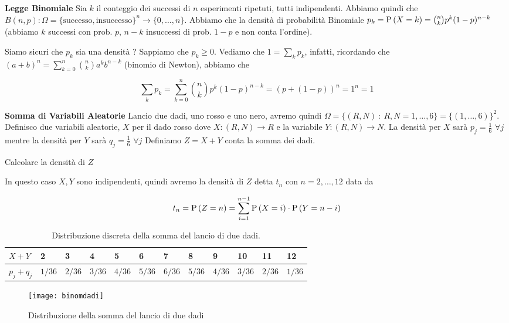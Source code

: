 \begin{defn}
    \textbf{Legge Binomiale}
    Sia $ k $ il conteggio dei successi di $ n $ esperimenti ripetuti, tutti indipendenti. Abbiamo quindi che $ B(n,p) : \Omega=\{\text{successo},\text{insuccesso}\}^n \to \{0, \dots, n\} $. Abbiamo che la densit\`a  di probabilit\`a  Binomiale $ p_k = \text{P}\left(X=k\right) = \binom{n}{k} p^k(1-p)^{n-k} $ (abbiamo $k$ successi con prob. $p$,
 $n-k$ insuccessi di prob. $1-p$ e non conta l'ordine).
\end{defn}
Siamo sicuri che $ p_k $ sia una densit\`a ? Sappiamo che $ p_k \geq 0 $. Vediamo che $ 1 = \sum_{k} p_k $, infatti, ricordando che  $ (a+b)^n = \sum_{k=0}^{n} \binom{n}{k} a^k b^{n-k} $ (binomio di Newton), abbiamo che

\begin{equation*}
    \sum_{k} p_k = \sum_{k=0}^{n} \binom{n}{k} p^k (1-p)^{n-k} = (p+(1-p))^n = 1^n = 1
\end{equation*}

\begin{exmp}
    \textbf{Somma di Variabili Aleatorie}
    Lancio due dadi, uno rosso e uno nero, avremo quindi $ \Omega = \{(R, N)\ : \ R,N=1,\dots,6\}
    = \{(1,\dots,6)\}^2 $. Definisco due variabili aleatorie, $ X $ per il dado rosso dove $ X : (R, N) \to R $ e la variabile $ Y : (R, N) \to N $. La densit\`a  per $ X $ sar\`a  $ p_j = \frac{1}{6}$ $\forall j $ mentre la densit\`a  per $ Y $ sar\`a  $ q_j = \frac{1}{6}$ $\forall j $
    Definiamo $ Z = X + Y $ conta la somma dei dadi.



    Calcolare la densit\`a  di $ Z $

    In questo caso $ X, Y $ sono indipendenti, quindi avremo la densit\`a  di $ Z $ detta $ t_n $ con
    $n=2,\dots, 12$ data da
    
    \begin{equation*}
        t_n= \text{P}\left(Z = n\right) = \sum_{i=1}^{n-1} \text{P}\left(X = i\right) \cdot \text{P}\left(Y = n - i\right)
    \end{equation*}
    
    \begin{table}[H]
        \centering
        \caption{Distribuzione discreta della somma del lancio di due dadi.}
        \label{tab:distribdice1}
        \begin{tabular}{|l|l|l|l|l|l|l|l|l|l|l|l|}
            \hline
            $ X + Y $     & 2        & 3        & 4        & 5        & 6        & 7        & 8        & 9        & 10       & 11       & 12       \\ \hline
            $ p_j + q_j $ & $ 1/36 $ & $ 2/36 $ & $ 3/36 $ & $ 4/36 $ & $ 5/36 $ & $ 6/36 $ & $ 5/36 $ & $ 4/36 $ & $ 3/36 $ & $ 2/36 $ & $ 1/36 $ \\ \hline
        \end{tabular}
    \end{table}
    
    \begin{figure}[H]
        \centering
        \caption{Distribuzione della somma del lancio di due dadi}
        \texttt{[image: binomdadi]}
    \end{figure}
\end{exmp}


